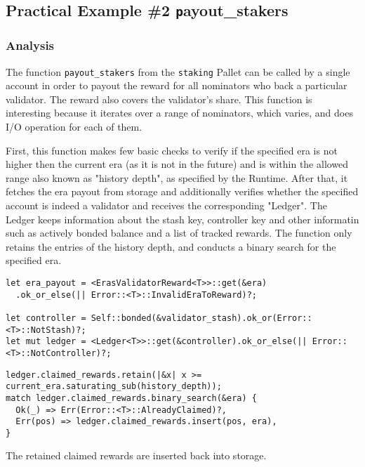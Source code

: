 \documentclass[11pt,a4paper]{article}
\begin{document}
\subsection{Practical Example \#2 {\texttt payout\_stakers}}\label{sec:practical-example-payout-stakers}

\subsubsection{Analysis}

The function \verb|payout_stakers| from the \verb|staking| Pallet can be called
by a single account in order to payout the reward for all nominators who back a
particular validator. The reward also covers the validator's share. This
function is interesting because it iterates over a range of nominators, which
varies, and does I/O operation for each of them.
\newline

First, this function makes few basic checks to verify if the specified era is
not higher then the current era (as it is not in the future) and is within the
allowed range also known as "history depth", as specified by the Runtime. After
that, it fetches the era payout from storage and additionally verifies whether
the specified account is indeed a validator and receives the corresponding
"Ledger". The Ledger keeps information about the stash key, controller key and
other informatin such as actively bonded balance and a list of tracked rewards.
The function only retains the entries of the history depth, and conducts a
binary search for the specified era.

\begin{verbatim}
let era_payout = <ErasValidatorReward<T>>::get(&era)
  .ok_or_else(|| Error::<T>::InvalidEraToReward)?;

let controller = Self::bonded(&validator_stash).ok_or(Error::<T>::NotStash)?;
let mut ledger = <Ledger<T>>::get(&controller).ok_or_else(|| Error::<T>::NotController)?;
\end{verbatim}

\begin{verbatim}
ledger.claimed_rewards.retain(|&x| x >= current_era.saturating_sub(history_depth));
match ledger.claimed_rewards.binary_search(&era) {
  Ok(_) => Err(Error::<T>::AlreadyClaimed)?,
  Err(pos) => ledger.claimed_rewards.insert(pos, era),
}
\end{verbatim}

The retained claimed rewards are inserted back into storage.
\end{document}
